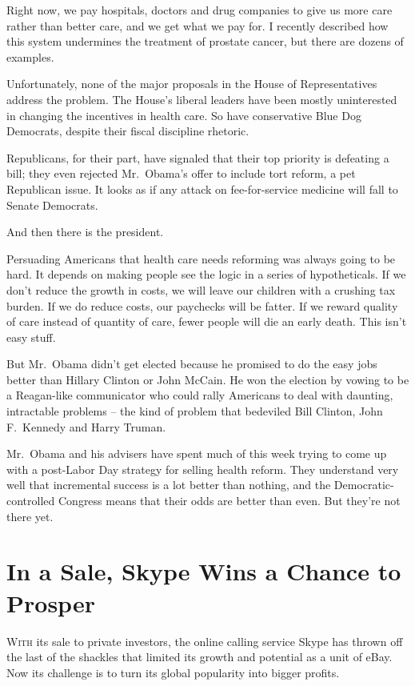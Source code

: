 ﻿\documentclass[12pt]{article}
\begin{document}
Right now, we pay hospitals, doctors and drug companies to give us more care rather than better
care, and we get what we pay for. I recently described how this system undermines the treatment of
prostate cancer, but there are dozens of examples.

Unfortunately, none of the major proposals in the House of Representatives address the problem. The
House's liberal leaders have been mostly uninterested in changing the incentives in health care. So
have conservative Blue Dog Democrats, despite their fiscal discipline rhetoric\cite{rhetoric}.

Republicans, for their part, have signaled that their top priority is defeating a bill; they even
rejected Mr.~Obama's offer to include tort reform, a pet Republican issue. It looks as if any attack
on fee-for-service medicine will fall to Senate Democrats.

And then there is the president.

Persuading Americans that health care needs reforming was always going to be hard. It depends on
making people see the logic in a series of hypotheticals. If we don't reduce the growth in costs, we
will leave our children with a crushing tax burden. If we do reduce costs, our paychecks will be
fatter. If we reward quality of care instead of quantity of care, fewer people will die an early
death. This isn't easy stuff.

But Mr.~Obama didn't get elected because he promised to do the easy jobs better than Hillary Clinton
or John McCain. He won the election by vowing to be a Reagan-like communicator who could rally
Americans to deal with daunting\cite{daunt}, intractable\cite{intractable} problems -- the kind of
problem that bedeviled Bill Clinton, John F.~Kennedy and Harry Truman.

Mr.~Obama and his advisers have spent much of this week trying to come up with a post-Labor Day
strategy for selling health reform. They understand very well that incremental success is a lot
better than nothing, and the Democratic-controlled Congress means that their odds are better than
even. But they're not there yet.

\section{In a Sale, Skype Wins a Chance to Prosper}

\lettrine{W}{ith} its sale to private investors, the online calling service Skype has thrown off the
last of the shackles\cite{shackle} that limited its growth and potential as a unit of eBay. Now its
challenge is to turn its global popularity into bigger profits.
\end{document}
